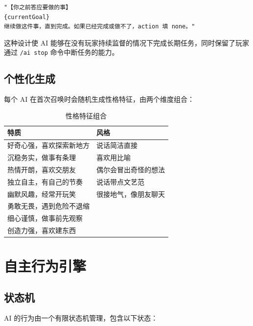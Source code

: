 \documentclass[12pt,a4paper]{article}
\begin{document}
\begin{lstlisting}[caption={目标注入 Prompt},label={lst:goal_prompt}]
"【你之前答应要做的事】
{currentGoal}
继续做这件事，直到完成。如果已经完成或做不了，action 填 none。"
\end{lstlisting}

这种设计使 AI 能够在没有玩家持续监督的情况下完成长期任务，同时保留了玩家通过 \texttt{/ai stop} 命令中断任务的能力。

\subsection{个性化生成}

每个 AI 在首次召唤时会随机生成性格特征，由两个维度组合：

\begin{table}[H]
\centering
\caption{性格特征组合}
\label{tab:personality}
\begin{tabular}{@{}ll@{}}
\toprule
\textbf{特质} & \textbf{风格} \\
\midrule
好奇心强，喜欢探索新地方 & 说话简洁直接 \\
沉稳务实，做事有条理 & 喜欢用比喻 \\
热情开朗，喜欢交朋友 & 偶尔会冒出奇怪的想法 \\
独立自主，有自己的节奏 & 说话带点文艺范 \\
幽默风趣，经常开玩笑 & 很接地气，像朋友聊天 \\
勇敢无畏，遇到危险不退缩 & \\
细心谨慎，做事前先观察 & \\
创造力强，喜欢建东西 & \\
\bottomrule
\end{tabular}
\end{table}

\section{自主行为引擎}

\subsection{状态机}

AI 的行为由一个有限状态机管理，包含以下状态：
\end{document}
